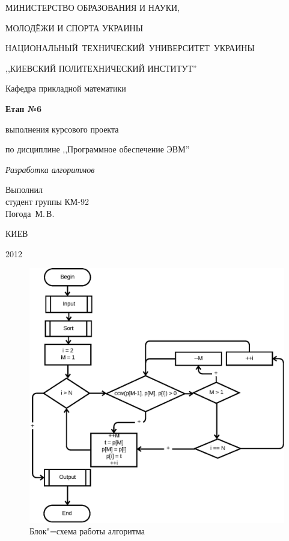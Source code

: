 \documentclass[a4paper,12pt,notitlepage,headsepline,pdftex]{scrartcl}
\begin{document}
\begin{titlepage}
  \begin{center}
    \large
    \MakeUppercase{Министерство образования и науки,}

    \MakeUppercase{молодёжи и спорта Украины}

    \mbox{\MakeUppercase{Национальный технический университет Украины}}

    \MakeUppercase{,,Киевский политехнический институт''}

    \addvspace{6pt}

    \normalsize
    Кафедра прикладной математики

    \vfill

    \textbf{Етап №6}

    выполнения курсового проекта

    по дисциплине ,,Программное обеспечение ЭВМ''

    \emph{Разработка алгоритмов}
  \end{center}

  \vfill

  \noindent
  Выполнил\\
  студент группы КМ-92\\
  Погода~М.\,В.\\
  \vfill

  \begin{center}
    КИЕВ

    2012
  \end{center}
\end{titlepage}

\begin{figure}[h]
  \begin{center}
    \includegraphics{algo.eps}
  \end{center}
  \caption{Блок"=схема работы алгоритма}
  \label{fig:algo}
\end{figure}
\end{document}

